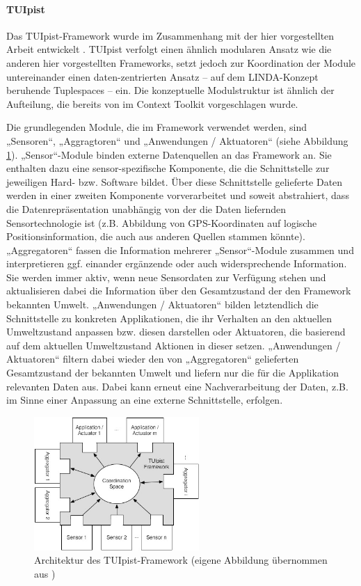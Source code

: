 \paragraph{TUIpist} %
\label{par:tuipist}

Das TUIpist-Framework \citep{Furtmuller07} wurde im Zusammenhang mit der hier vorgestellten Arbeit entwickelt \citep{Furtmuller07a}. TUIpist verfolgt einen ähnlich modularen Ansatz wie die anderen hier vorgestellten Frameworks, setzt jedoch zur Koordination der Module untereinander einen daten-zentrierten Ansatz -- auf dem LINDA-Konzept \citep{Carriero89} beruhende Tuplespaces -- ein. Die konzeptuelle Modulstruktur ist ähnlich der Aufteilung, die bereits von \citet{Dey01} im Context Toolkit vorgeschlagen wurde.

Die grundlegenden Module, die im Framework verwendet werden, sind „Sensoren“, „Aggragtoren“ und „Anwendungen / Aktuatoren“ (siehe Abbildung \ref{fig:img_ImplementierungInput_TUIpist}). „Sensor“-Module binden externe Datenquellen an das Framework an. Sie enthalten dazu eine sensor-spezifische Komponente, die die Schnittstelle zur jeweiligen Hard- bzw. Software bildet. Über diese Schnittstelle gelieferte Daten werden in einer zweiten Komponente vorverarbeitet und soweit abstrahiert, dass die Datenrepräsentation unabhängig von der die Daten liefernden Sensortechnologie ist (z.B. Abbildung von \gls{GPS}-Koordinaten auf logische Positionsinformation, die auch aus anderen Quellen stammen könnte). „Aggregatoren“ fassen die Information mehrerer „Sensor“-Module zusammen und interpretieren ggf. einander ergänzende oder auch widersprechende Information. Sie werden immer aktiv, wenn neue Sensordaten zur Verfügung stehen und aktualisieren dabei die Information über den Gesamtzustand der den Framework bekannten Umwelt. „Anwendungen / Aktuatoren“ bilden letztendlich die Schnittstelle zu konkreten Applikationen, die ihr Verhalten an den aktuellen Umweltzustand anpassen bzw. diesen darstellen oder Aktuatoren, die basierend auf dem aktuellen Umweltzustand Aktionen in dieser setzen. „Anwendungen / Aktuatoren“ filtern dabei wieder den von „Aggregatoren“ gelieferten Gesamtzustand der bekannten Umwelt und liefern nur die für die Applikation relevanten Daten aus. Dabei kann erneut eine Nachverarbeitung der Daten, z.B. im Sinne einer Anpassung an eine externe Schnittstelle, erfolgen.

\begin{figure}[htbp]
	\centering
		\includegraphics[height=2in]{img/ImplementierungInput/TUIpistArchitecture.jpg}
	\caption[Architektur des TUIpist-Framework]{Architektur des TUIpist-Framework (eigene Abbildung übernommen aus \citep{Furtmuller07a})}
	\label{fig:img_ImplementierungInput_TUIpist}
\end{figure}

